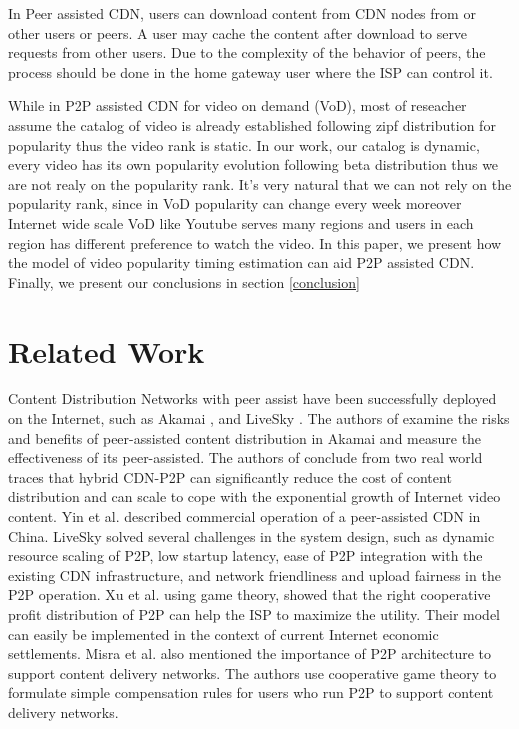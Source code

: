 \documentclass[conference]{IEEEtran}
\begin{document}
In Peer assisted CDN, users can download content from CDN nodes from or other users or peers. 
A user may cache the content after download to serve requests from other users. 
Due to the complexity of the behavior of peers, the process should be done in the home gateway user where the ISP can control it.

While in P2P assisted CDN for video on demand (VoD), most of reseacher assume the catalog of video is already established following zipf distribution for popularity thus the video rank is static. 
In our work, our catalog is dynamic, every video has its own popularity evolution following beta distribution thus we are not realy on the popularity rank.  
It's very natural that we can not rely on the popularity rank, since in VoD popularity can change every week moreover Internet wide scale VoD like Youtube serves many regions and users in each region has different preference to watch the video.
In this paper, we present how the model of video popularity timing estimation can aid P2P assisted CDN.
Finally, we present our conclusions in section \ref{conclusion}




\section{Related Work}\label{relatedwork}
Content Distribution Networks with peer assist have been successfully deployed on the Internet, such as Akamai \cite{Zhao:2013:PCD:2504730.2504752}, \cite{Huang:2008:UHC:1496046.1496064} and LiveSky \cite{Yin:2010:LEC:1823746.1823750}.  
The authors of \cite{Zhao:2013:PCD:2504730.2504752} examine the risks and benefits of peer-assisted content distribution in Akamai and measure the effectiveness of its peer-assisted. 
The authors of \cite{Huang:2008:UHC:1496046.1496064} conclude from two real world traces that hybrid CDN-P2P can significantly reduce the cost of content distribution and can scale to cope with the exponential growth of Internet video content.  
Yin et al. \cite{Yin:2010:LEC:1823746.1823750} described commercial operation of a peer-assisted CDN in China.  
LiveSky solved several challenges in the system design, such as dynamic resource scaling of P2P, low startup latency, ease of P2P integration with the existing CDN infrastructure, and network friendliness and upload fairness in the P2P operation.  
Xu et al.\cite{DBLP:journals/corr/abs-1212-4915} using game theory, showed that the right cooperative profit distribution of P2P can help the ISP to maximize the utility.  
Their model can easily be implemented in the context of current Internet economic settlements.  
Misra et al.\cite{Misra:2010:IPS:1811099.1811064} also mentioned the importance of P2P architecture to support content delivery networks.
The authors use cooperative game theory to formulate simple compensation rules for users who run P2P to support content delivery networks.
\end{document}
